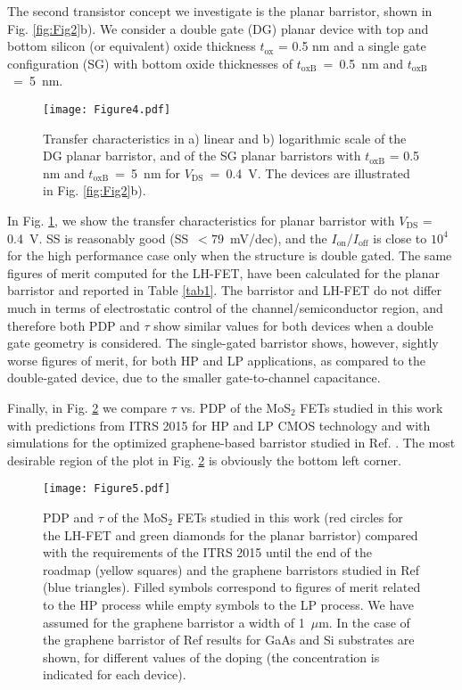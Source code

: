 \documentclass[aps,reprint,superscriptaddress,secnumarabic,amssymb,showpacs]{revtex4-1}
\begin{document}
The second transistor concept we investigate is the planar barristor, shown in Fig. \ref{fig:Fig2}b). We  consider a double gate (DG)
planar device with top and bottom silicon (or equivalent) oxide thickness $t_{\text{ox}}$ = 0.5 nm and a single gate configuration (SG) with bottom oxide thicknesses of  $t_{\text{oxB}}$~=~0.5~nm and $t_{\text{oxB}}$~=~5~nm.

\begin{figure}[h!!!]
\texttt{[image: Figure4.pdf]}
\caption{Transfer characteristics in a) linear and b) logarithmic scale of the DG planar barristor, and of the SG planar barristors with
$t_{\text{oxB}}$ = 0.5 nm and $t_{\text{oxB}}$~=~5~nm for $V_{\text{DS}}$~=~0.4~V. The devices are illustrated in Fig. \ref{fig:Fig2}b).}
\label{fig:Fig7}
\end{figure}


In Fig. \ref{fig:Fig7}, we show the transfer characteristics for planar barristor with $V_{\text{DS}}$ = 0.4~V. SS is reasonably good (SS~$ < 79$~mV/dec), and the $I_{\text{on}}$/$I_{\text{off}}$ is close to $10^4$ for the high performance case only when the structure is double gated. The same figures of merit computed for the LH-FET, have been calculated for the planar barristor and reported in Table \ref{tab1}. The barristor and LH-FET do not differ much in terms of electrostatic control of the channel/semiconductor region, and therefore both PDP and $\tau$ show similar values for both devices when a double gate geometry is considered. The single-gated barristor shows, however, sightly worse figures of merit, for both HP and LP applications, as compared to the double-gated device, due to the smaller gate-to-channel capacitance.


Finally, in Fig. \ref{fig:Fig8} we compare $\tau$ vs. PDP of the MoS$_2$ FETs studied in this work with predictions from ITRS 2015 \cite{ITRS} for HP and LP CMOS technology and with simulations for the optimized graphene-based barristor studied in Ref. \cite{Fiori2012}. The most desirable region of the plot in Fig. \ref{fig:Fig8} is obviously the bottom left corner.

\begin{figure} [h!!!]
\texttt{[image: Figure5.pdf]}
\caption{PDP and $\tau$ of the MoS$_2$ FETs studied in this work (red circles for the LH-FET and green diamonds for the planar barristor) compared with the requirements of the ITRS 2015 \cite{ITRS} until the end of the roadmap (yellow squares) and the graphene barristors studied in Ref \cite{Logoteta2014} (blue triangles). Filled symbols correspond to figures of merit related to the HP 
process while empty symbols to the LP process. We have assumed for the graphene barristor a width of 1~$\mu$m. In the case of the graphene barristor of Ref \cite{Fiori2012} results for GaAs and Si substrates are shown, for different values of the doping (the concentration is indicated for each device).}
\label{fig:Fig8}
\end{figure}
\end{document}
